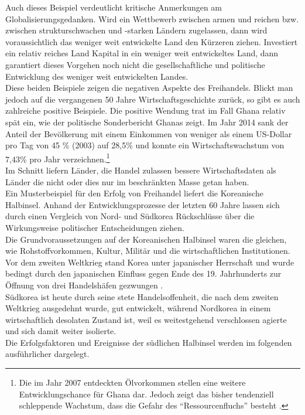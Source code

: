 %
 Auch dieses Beispiel verdeutlicht kritische Anmerkungen am Globalisierungsgedanken. Wird ein Wettbewerb zwischen armen und reichen bzw. zwischen strukturschwachen und -starken Ländern zugelassen, dann wird voraussichtlich das weniger weit entwickelte Land den Kürzeren ziehen. Investiert ein relativ reiches Land Kapital in ein weniger weit entwickeltes Land, dann garantiert dieses Vorgehen noch nicht die gesellschaftliche und politische Entwicklung des weniger weit entwickelten Landes. \\
%
 Diese beiden Beispiele zeigen die negativen Aspekte des Freihandels. Blickt man jedoch auf die vergangenen 50 Jahre Wirtschaftsgeschichte zurück, so gibt es auch zahlreiche positive Beispiele. Die positive Wendung trat im Fall Ghana relativ spät ein, wie der politische Sonderbericht Ghanas zeigt. Im Jahr 2014 sank der Anteil der Bevölkerung mit einem Einkommen von weniger als einem US-Dollar pro Tag von 45 {\%} (2003) auf 28,5{\%} und konnte ein Wirtschaftswachstum von 7,43{\%} pro Jahr verzeichnen.\footnote{Die im Jahr 2007 entdeckten Ölvorkommen stellen eine weitere Entwicklungschance für Ghana dar. Jedoch zeigt das bisher tendenziell schleppende Wachstum, dass die Gefahr des "`Ressourcenfluchs"' besteht \cite{Regeher.2013}.}\\
%
  Im Schnitt liefern Länder, die Handel zulassen bessere Wirtschaftsdaten als Länder die nicht oder dies nur im beschränkten Masse getan haben.\\
%
Ein Musterbeispiel für den Erfolg von Freihandel liefert die Koreanische Halbinsel. Anhand der Entwicklungsprozesse der letzten 60 Jahre lassen sich durch einen Vergleich von Nord- und Südkorea Rückschlüsse über die Wirkungsweise politischer Entscheidungen ziehen. \\
%
 Die Grundvoraussetzungen auf der Koreanischen Halbinsel waren die gleichen, wie Rohstoffvorkommen, Kultur, Militär und die wirtschaftlichen Institutionen. Vor dem zweiten Weltkrieg stand Korea unter japanischer Herrschaft und wurde bedingt durch den japanischen Einfluss gegen Ende des 19. Jahrhunderts zur Öffnung von drei Handelshäfen gezwungen \cite{Engelhard.2004,Lee.1999}.\\
%
Südkorea ist heute durch seine stete Handelsoffenheit, die nach dem zweiten Weltkrieg ausgedehnt wurde, gut entwickelt, während Nordkorea in einem wirtschaftlich desolaten Zustand ist, weil es weitestgehend verschlossen agierte und sich damit weiter isolierte.\\
%
 Die Erfolgsfaktoren und Ereignisse der südlichen Halbinsel werden im folgenden ausführlicher dargelegt.
